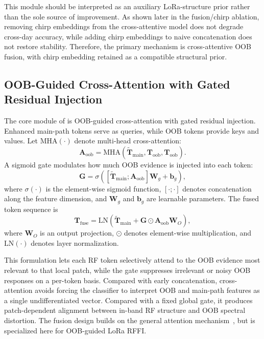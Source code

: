 This module should be interpreted as an auxiliary LoRa-structure prior rather than the sole source of improvement. As shown later in the fusion/chirp ablation, removing chirp embeddings from the cross-attentive model does not degrade cross-day accuracy, while adding chirp embeddings to naive concatenation does not restore stability. Therefore, the primary mechanism is cross-attentive OOB fusion, with chirp embedding retained as a compatible structural prior.

\subsection{OOB-Guided Cross-Attention with Gated Residual Injection}

The core module of \model{} is OOB-guided cross-attention with gated residual injection. Enhanced main-path tokens serve as queries, while OOB tokens provide keys and values. Let $\mathrm{MHA}(\cdot)$ denote multi-head cross-attention:
\begin{equation}
    \mathbf{A}_{\mathrm{oob}}
    =
    \mathrm{MHA}
    \left(
    \widetilde{\mathbf{T}}_{\mathrm{main}},
    \mathbf{T}_{\mathrm{oob}},
    \mathbf{T}_{\mathrm{oob}}
    \right).
\end{equation}
A sigmoid gate modulates how much OOB evidence is injected into each token:
\begin{equation}
    \mathbf{G}
    =
    \sigma
    \left(
    [\widetilde{\mathbf{T}}_{\mathrm{main}};\mathbf{A}_{\mathrm{oob}}]\mathbf{W}_{g}
    +\mathbf{b}_{g}
    \right),
\end{equation}
where $\sigma(\cdot)$ is the element-wise sigmoid function, $[\cdot;\cdot]$ denotes concatenation along the feature dimension, and $\mathbf{W}_{g}$ and $\mathbf{b}_{g}$ are learnable parameters. The fused token sequence is
\begin{equation}
    \mathbf{T}_{\mathrm{fuse}}
    =
    \mathrm{LN}
    \left(
    \widetilde{\mathbf{T}}_{\mathrm{main}}
    +
    \mathbf{G}\odot \mathbf{A}_{\mathrm{oob}}\mathbf{W}_{O}
    \right),
\end{equation}
where $\mathbf{W}_{O}$ is an output projection, $\odot$ denotes element-wise multiplication, and $\mathrm{LN}(\cdot)$ denotes layer normalization.

This formulation lets each RF token selectively attend to the OOB evidence most relevant to that local patch, while the gate suppresses irrelevant or noisy OOB responses on a per-token basis. Compared with early concatenation, cross-attention avoids forcing the classifier to interpret OOB and main-path features as a single undifferentiated vector. Compared with a fixed global gate, it produces patch-dependent alignment between in-band RF structure and OOB spectral distortion. The fusion design builds on the general attention mechanism~\cite{vaswani2017attention}, but is specialized here for OOB-guided LoRa RFFI.

